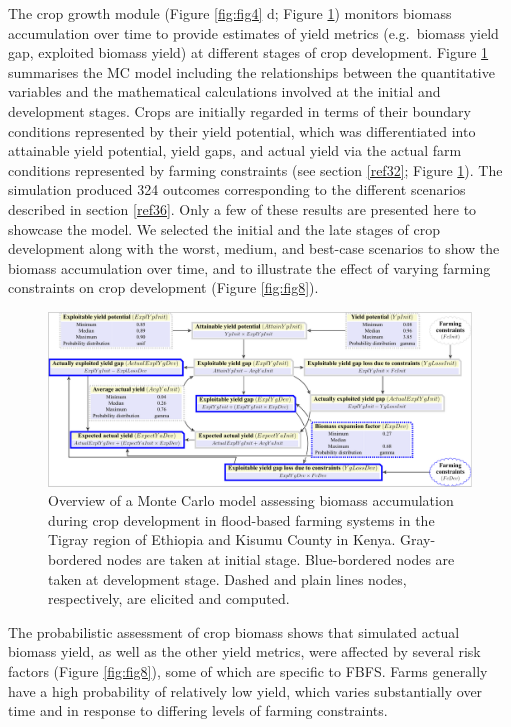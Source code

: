 \documentclass[]{elsarticle} %
\begin{document}
The crop growth module (Figure \ref{fig:fig4} d; Figure \ref{fig:fig7}) monitors biomass accumulation over time to provide estimates of yield metrics (e.g.~biomass yield gap, exploited biomass yield) at different stages of crop development. Figure \ref{fig:fig7} summarises the MC model including the relationships between the quantitative variables and the mathematical calculations involved at the initial and development stages. Crops are initially regarded in terms of their boundary conditions represented by their yield potential, which was differentiated into attainable yield potential, yield gaps, and actual yield via the actual farm conditions represented by farming constraints (see section \ref{ref32}; Figure \ref{fig:fig7}). The simulation produced 324 outcomes corresponding to the different scenarios described in section \ref{ref36}. Only a few of these results are presented here to showcase the model. We selected the initial and the late stages of crop development along with the worst, medium, and best-case scenarios to show the biomass accumulation over time, and to illustrate the effect of varying farming constraints on crop development (Figure \ref{fig:fig8}).

\begin{figure}[!h]

{\centering \includegraphics[width=1\linewidth,]{figures/monte-carlo-model-1} 

}

\caption{Overview of a Monte Carlo model assessing biomass accumulation during crop development in flood-based farming systems in the Tigray region of Ethiopia and Kisumu County in Kenya. Gray-bordered nodes are taken at initial stage. Blue-bordered nodes are taken at development stage. Dashed and plain lines nodes, respectively, are elicited and computed.}\label{fig:fig7}
\end{figure}

The probabilistic assessment of crop biomass shows that simulated actual biomass yield, as well as the other yield metrics, were affected by several risk factors (Figure \ref{fig:fig8}), some of which are specific to FBFS. Farms generally have a high probability of relatively low yield, which varies substantially over time and in response to differing levels of farming constraints.
\end{document}

